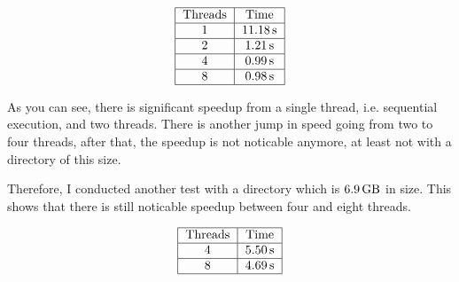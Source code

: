 \documentclass{article}
\begin{document}
  \begin{doublespacing}
    \begin{align*}
      \begin{tabular}{|*{2}{c|}}
        \hline
        Threads & Time \\
        \hline
        $1$ & $\SI{11.18}{\second}$ \\
        \hline
        $2$ & $\SI{1.21}{\second}$ \\
        \hline
        $4$ & $\SI{0.99}{\second}$ \\
        \hline
        $8$ & $\SI{0.98}{\second}$ \\
        \hline
      \end{tabular}
    \end{align*}
  \end{doublespacing}

  As you can see, there is significant speedup from a single thread, i.e. sequential execution, and two threads. There is another jump in speed going from two to four threads, after that, the speedup is not noticable anymore, at least not with a directory of this size.

  Therefore, I conducted another test with a directory which is $\SI{6.9}{\giga\byte}$ in size. This shows that there is still noticable speedup between four and eight threads.

  \begin{doublespacing}
    \begin{align*}
      \begin{tabular}{|*{2}{c|}}
        \hline
        Threads & Time \\
        \hline
        $4$ & $\SI{5.50}{\second}$ \\
        \hline
        $8$ & $\SI{4.69}{\second}$ \\
        \hline
      \end{tabular}
    \end{align*}
  \end{doublespacing}
\end{document}
